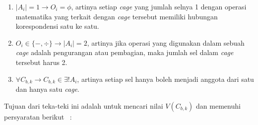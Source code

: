 \begin{enumerate}
\item \begin{math}|A_i| = 1 \rightarrow O_i = \phi\end{math}, artinya setiap \textit{cage} yang jumlah selnya 1 dengan operasi matematika yang terkait dengan \textit{cage} tersebut memiliki hubungan korespondensi satu ke satu.
\item \begin{math}O_i \in \{-, \div\} \rightarrow |A_i| = 2\end{math}, artinya jika operasi yang digunakan dalam sebuah \textit{cage} adalah pengurangan atau pembagian, maka jumlah sel dalam \textit{cage} tersebut harus 2.
\item \begin{math}\forall C_{b,k} \rightarrow C_{b,k} \in \exists! A_i\end{math}, artinya setiap sel hanya boleh menjadi anggota dari satu dan hanya satu \textit{cage}.
\end{enumerate}
Tujuan dari teka-teki ini adalah untuk mencari nilai \begin{math}V(C_{b,k})\end{math} dan memenuhi persyaratan berikut ~\cite{johanna:12:hybrid}:
